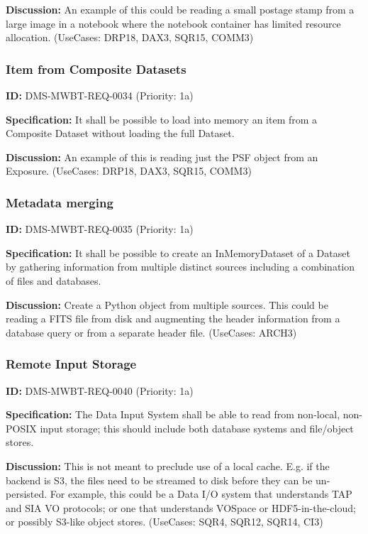 \documentclass[SE,toc,lsstdraft]{lsstdoc}
\begin{document}
\textbf{Discussion:}
An example of this could be reading a small postage stamp from a large image in a notebook where the notebook container has limited resource allocation. (UseCases: DRP18, DAX3, SQR15, COMM3)

\subsubsection{Item from Composite Datasets}

\label{DMS-MWBT-REQ-0034}
\textbf{ID:} DMS-MWBT-REQ-0034 (Priority: 1a)

\textbf{Specification:}
It shall be possible to load into memory an item from a Composite Dataset without loading the full Dataset.

\textbf{Discussion:}
An example of this is reading just the PSF object from an Exposure. (UseCases: DRP18, DAX3, SQR15, COMM3)

\subsubsection{Metadata merging}

\label{DMS-MWBT-REQ-0035}
\textbf{ID:} DMS-MWBT-REQ-0035 (Priority: 1a)

\textbf{Specification:}
It shall be possible to create an InMemoryDataset of a Dataset by gathering information from multiple distinct sources including a combination of files and databases.

\textbf{Discussion:}
Create a Python object from multiple sources. This could be reading a FITS file from disk and augmenting the header information from a database query or from a separate header file. (UseCases: ARCH3)

\subsubsection{Remote Input Storage}

\label{DMS-MWBT-REQ-0040}
\textbf{ID:} DMS-MWBT-REQ-0040 (Priority: 1a)

\textbf{Specification:}
The Data Input System shall be able to read from non-local, non-POSIX input storage; this should include both database systems and file/object stores.

\textbf{Discussion:}
This is not meant to preclude use of a local cache. E.g. if the backend is S3, the files need to be streamed to disk before they can be un-persisted. For example, this could be a Data I/O system that understands TAP and SIA VO protocols; or one that understands VOSpace or HDF5-in-the-cloud; or possibly S3-like object stores. (UseCases: SQR4, SQR12, SQR14, CI3)
\end{document}

